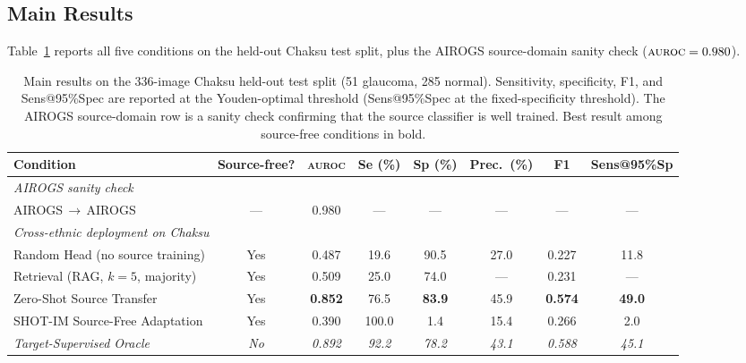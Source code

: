\documentclass[11pt]{article}
\newcommand{\src}{AIROGS}
\newcommand{\auroc}{\textsc{auroc}}
\newcommand{\se}{Se}
\newcommand{\spec}{Sp}
\begin{document}
\subsection{Main Results}

Table~\ref{tab:main} reports all five conditions on the held-out Chaksu
test split, plus the \src{} source-domain sanity check ($\auroc{} = 0.980$).

\begin{table}[t]
\centering
\small
\caption{Main results on the 336-image Chaksu held-out test split (51
  glaucoma, 285 normal). Sensitivity, specificity, F1, and Sens@95\%Spec
  are reported at the Youden-optimal threshold (Sens@95\%Spec at the
  fixed-specificity threshold). The AIROGS source-domain row is a
  sanity check confirming that the source classifier is well trained.
  Best result among source-free conditions in bold.}
\label{tab:main}
\begin{tabular}{lccccccc}
\toprule
\textbf{Condition} & \textbf{Source-free?} & \textbf{\auroc{}} & \textbf{\se{} (\%)} & \textbf{\spec{} (\%)} & \textbf{Prec.\ (\%)} & \textbf{F1} & \textbf{Sens@95\%Sp} \\
\midrule
\multicolumn{8}{l}{\emph{\src{} sanity check}} \\
AIROGS\,$\to$\,AIROGS  & --- & 0.980 & --- & --- & --- & --- & --- \\
\midrule
\multicolumn{8}{l}{\emph{Cross-ethnic deployment on Chaksu}} \\
Random Head (no source training)        & Yes & 0.487 & 19.6 & 90.5 & 27.0 & 0.227 & 11.8 \\
Retrieval (RAG, $k{=}5$, majority)      & Yes & 0.509 & 25.0 & 74.0 & --- & 0.231 & --- \\
Zero-Shot Source Transfer               & Yes & \textbf{0.852} & 76.5 & \textbf{83.9} & 45.9 & \textbf{0.574} & \textbf{49.0} \\
SHOT-IM Source-Free Adaptation          & Yes & 0.390 & 100.0 & 1.4 & 15.4 & 0.266 & 2.0 \\
\midrule
\textit{Target-Supervised Oracle}       & \textit{No} & \textit{0.892} & \textit{92.2} & \textit{78.2} & \textit{43.1} & \textit{0.588} & \textit{45.1} \\
\bottomrule
\end{tabular}
\end{table}
\end{document}
